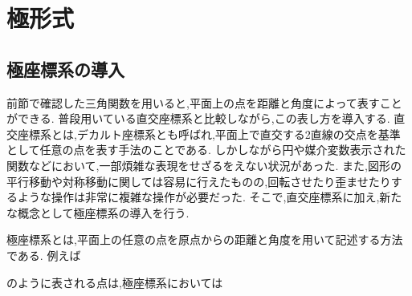 \section{極形式}
  \subsection{極座標系の導入}
    前節で確認した三角関数を用いると,平面上の点を距離と角度によって表すことができる.
    普段用いている直交座標系と比較しながら,この表し方を導入する.
    直交座標系とは,デカルト座標系とも呼ばれ,平面上で直交する2直線の交点を基準として任意の点を表す手法のことである.
    しかしながら円や媒介変数表示された関数などにおいて,一部煩雑な表現をせざるをえない状況があった.
    また,図形の平行移動や対称移動に関しては容易に行えたものの,回転させたり歪ませたりするような操作は非常に複雑な操作が必要だった.
    そこで,直交座標系に加え,新たな概念として極座標系の導入を行う.
    
    極座標系とは,平面上の任意の点を原点からの距離と角度を用いて記述する方法である.
    例えば


    のように表される点は,極座標系においては

